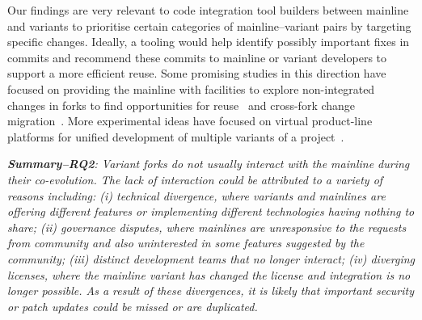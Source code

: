 Our findings are very relevant to code integration tool builders between mainline and variants to prioritise certain categories of mainline--variant pairs by targeting specific changes.
Ideally, a tooling would help identify possibly important fixes in commits and recommend these commits to mainline or variant developers to support a more efficient reuse.
Some promising studies in this direction have focused on providing the mainline with facilities to explore non-integrated changes in forks to find opportunities for reuse~\cite{Ren:2018} and cross-fork change migration~\cite{Ren:2019}. More experimental ideas have focused on virtual product-line platforms for unified development of multiple variants of a project~\cite{Antkiewicz:icse:2014,Fischer:saner:2014,Montalvillo:spl:2015,rubin:icse:2013,Stefan:2016:icsme}.

\begin{custombox}
\emph{\textbf{Summary--RQ2}: Variant forks do not usually interact with the mainline during their co-evolution. The lack of interaction could be attributed to a variety of reasons including: (i) technical divergence, where variants and mainlines are offering different features or implementing different technologies having nothing to share; (ii) governance disputes, where mainlines are unresponsive to the requests from community and also uninterested in some features suggested by the community; (iii) distinct development teams that no longer interact; (iv) diverging licenses, where the mainline variant has changed the license and integration is no longer possible.
As a result of these divergences, it is likely that important security or patch updates could be missed or are duplicated.
}
\end{custombox}
